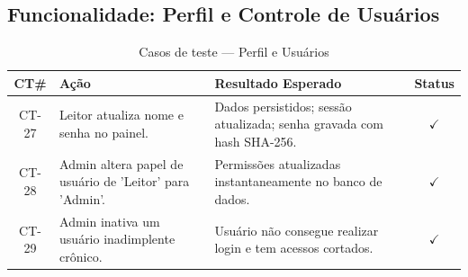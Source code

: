\subsection{Funcionalidade: Perfil e Controle de Usuários}

\begin{table}[h!]
	\centering
	\caption{Casos de teste --- Perfil e Usuários}
	\label{tab:teste_usuarios}
	\begin{tabular}{|c|p{6cm}|p{6cm}|c|}
		\hline
		\textbf{CT\#} & \textbf{Ação} & \textbf{Resultado Esperado} & \textbf{Status} \\ \hline
		CT-27 & Leitor atualiza nome e senha no painel. & Dados persistidos; sessão atualizada; senha gravada com hash SHA-256. & $\checkmark$ \\ \hline
		CT-28 & Admin altera papel de usuário de 'Leitor' para 'Admin'. & Permissões atualizadas instantaneamente no banco de dados. & $\checkmark$ \\ \hline
		CT-29 & Admin inativa um usuário inadimplente crônico. & Usuário não consegue realizar login e tem acessos cortados. & $\checkmark$ \\ \hline
	\end{tabular}
\end{table}
